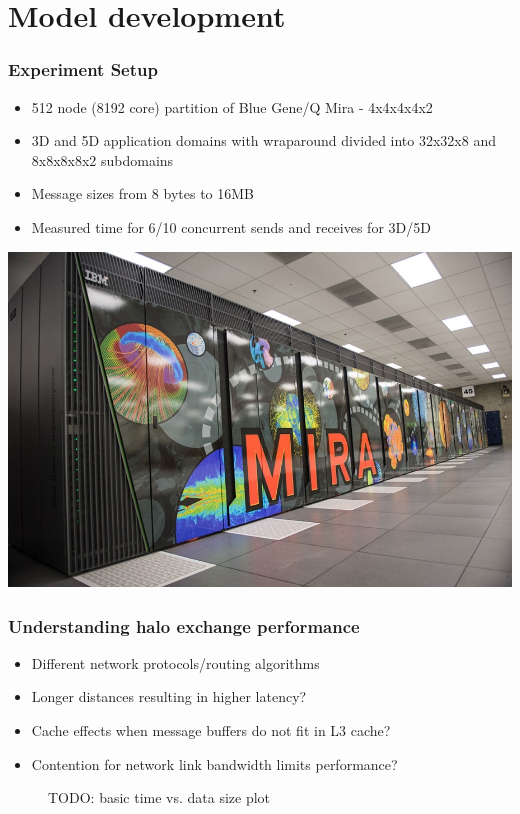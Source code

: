 \documentclass{beamer}
\begin{document}
\section{Model development}
\begin{frame}
\frametitle{Experiment Setup}
\begin{itemize}
  \item 512 node (8192 core) partition of Blue Gene/Q Mira - 4x4x4x4x2
  \item 3D and 5D application domains with wraparound
        divided into 32x32x8 and 8x8x8x8x2 subdomains
  \item Message sizes from 8 bytes to 16MB
  \item Measured time for 6/10 concurrent sends and receives for 3D/5D
\end{itemize}

\centering
\includegraphics[width=0.45\linewidth]{mira}

\end{frame}

\begin{frame}
\frametitle{Understanding halo exchange performance}
\begin{itemize}
  \item Different network protocols/routing algorithms
  \item Longer distances resulting in higher latency?
  \item Cache effects when message buffers do not fit in L3 cache?
  \item Contention for network link bandwidth limits performance?
\end{itemize}

\begin{figure}
TODO: basic time vs. data size plot
\end{figure}
\end{frame}

\end{document}
